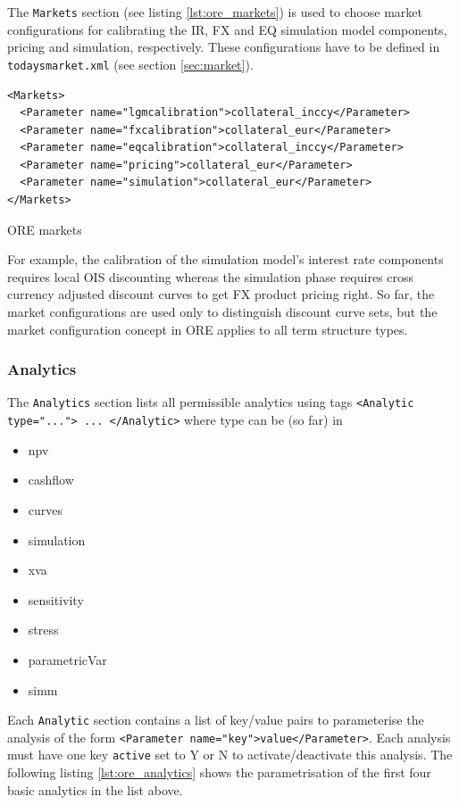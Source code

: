 \documentclass[12pt, a4paper]{article}
\begin{document}
The {\tt Markets} section (see listing \ref{lst:ore_markets}) is used to choose market configurations for calibrating
the IR, FX and EQ simulation model components, pricing and simulation, respectively. These configurations have to be 
defined
in {\tt todaysmarket.xml} (see section \ref{sec:market}).

\begin{listing}[H]
\begin{verbatim}
<Markets>
  <Parameter name="lgmcalibration">collateral_inccy</Parameter>
  <Parameter name="fxcalibration">collateral_eur</Parameter>
  <Parameter name="eqcalibration">collateral_inccy</Parameter>
  <Parameter name="pricing">collateral_eur</Parameter>
  <Parameter name="simulation">collateral_eur</Parameter>
</Markets>
\end{verbatim}
\caption{ORE markets}
\label{lst:ore_markets}
\end{listing}

For example, the calibration of the simulation model's interest rate components requires local OIS discounting whereas
the simulation phase requires cross currency adjusted discount curves to get FX product pricing right. So far, the
market configurations are used only to distinguish discount curve sets, but the market configuration concept in ORE
applies to all term structure types.

\subsubsection{Analytics}\label{sec:analytics}

The {\tt Analytics} section lists all permissible analytics using tags {\tt <Analytic type="..."> ... </Analytic>} where
type can be (so far) in
\begin{itemize}
\item npv
\item cashflow
\item curves
\item simulation
\item xva
\item sensitivity
\item stress
\item parametricVar
\item simm
\end{itemize}

Each {\tt Analytic} section contains a list of key/value pairs to parameterise the analysis of the form {\tt <Parameter
  name="key">value</Parameter>}. Each analysis must have one key {\tt active} set to Y or N to activate/deactivate this
analysis.  The following listing \ref{lst:ore_analytics} shows the parametrisation of the first four basic analytics in
the list above.
\end{document}
